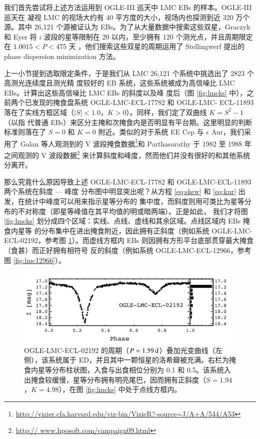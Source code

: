 我们首先尝试将上述方法运用到 OGLE-III 巡天中 LMC EBs 的样本\cite{Graczyk2011}。OGLE-III 巡天在
凝视 LMC 的视场大约有 40 平方度的大小，视场内也探测到近 320 万个源\cite{Ulaczyk2012}。其中 
26,121 个源被证认为 EBs\cite{Graczyk2011}。为了从大量数据中搜索这些双星，Graczyk 和 Eyer 将 $i$ 
波段的星等限制在 20 以内，至少拥有 120 个测光点，并且周期限定在 $1.0015 < P< 475$ 天
\cite{Graczyk2010}，他们搜索这些双星的周期运用了 Stellingwerf 提出的 phase dispersion minimization 
方法\cite{Stellingwerf1978}。

上一小节提到选取限定条件，于是我们从 LMC 26,121 个系统中挑选出了 2823 个高测光连续度且测光精
度较好的 EB 系统，这些系统被成为高信噪比 LMC EBs。计算出这些高信噪比 LMC EBs 的斜度以及峰
度后（图 \ref{fig:lmcks} 中），之前两个已发现的掩食盘系统 OGLE-LMC-ECL-17782 和 OGLE-LMC-
ECL-11893 落在了实线方框区域（$|S| < 1.0$，$K > 0$）。同样，我们定了双曲线 $K = S^2 - 1$（以指
代普通 EBs）来区分主掩和次掩食内是否明显有平台期。这里明显的判断标准则落在了 $S = 0$ 和 $K = 
0$ 附近。类似的对于系统 EE Cep 与  $\epsilon$ Aur，我们采用了 Galan 等人\cite{Galan2012}观测到的 
V 波段掩食数据\footnote{\url{http://vizier.cfa.harvard.edu/viz-bin/VizieR?-source=J/A+A/544/A53}}和 
Parthasarathy 于 1982 至 1988 年之间\cite{Parthasarathy1986}观测的 V 波段数据\footnote{\url{http://
www.hposoft.com/campaign09.html}} 来计算斜度和峰度，然而他们并没有很好的和其他系统分离开。

那么究竟什么原因导致上述 OGLE-LMC-ECL-17782 和 OGLE-LMC-ECL-11893 两个系统在斜度 --- 峰度
分布图中明显突出呢？从方程 \ref{eq:skew} 和 \ref{eq:kur} 出发，在统计中峰度可以用来指示星等分布的
集中度，而斜度则用可类比为星等分布的不对称度（即星等峰值在其平均值的明或暗两端）。正是如此，
我们才将图 \ref{fig:lmcks} 划分成四个区域：实线、点线、虚线和其余区域。点线区域内 EBs 掩食内星等
的分布集中在进出掩食附近，因此拥有正斜度（例如系统 OGLE-LMC-ECL-02192，参考图 
\ref{fig:lmc02192}）。而虚线方框内 EBs 则因拥有方形平台底部贯穿最大掩食（食甚）而正好拥有相符号
反的斜度（例如系统 OGLE-LMC-ECL-12966，参考图 \ref{fig:lmc12966}）。

\begin{figure}[t]
\centering
\includegraphics[width=0.98\textwidth,trim={0.0in 0.2in 0 0}]{figures/chapter3/f6_lmc02192.pdf}
\caption{OGLE-LMC-ECL-02192 的周期（$P = 1.59\, \mathrm{d}$）叠加光变曲线（左侧），该系统属于 ED，并且其中一颗恒星的洛希瓣被充满。右栏为掩食内星等分布柱状图，入食与出食相位分别为 0.1 和 0.5。该系统入出掩食较缓慢，星等分布拥有明亮尾巴，因而拥有正斜度（$S=1.94$，$K=4.98$），在图 \ref{fig:lmcks} 中处于点线方框内。}
\label{fig:lmc02192}
\end{figure}

